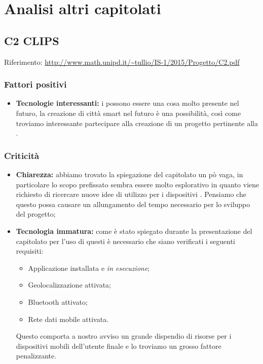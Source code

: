\documentclass{scalatekids-article}
\begin{document}
\section{Analisi altri capitolati}
\subsection{C2 CLIPS}
Riferimento: \url{http://www.math.unipd.it/~tullio/IS-1/2015/Progetto/C2.pdf}\\
\subsubsection{Fattori positivi}
\begin{itemize}
  \item \textbf{Tecnologie interessanti:} i  possono essere una cosa molto presente nel futuro, la creazione di città smart nel futuro è una possibilità, così come troviamo interessante partecipare alla creazione di un progetto pertinente alla .
\end{itemize}
\subsubsection{Criticità}
\begin{itemize}
  \item \textbf{Chiarezza:} abbiamo trovato la spiegazione del capitolato un pò vaga, in particolare lo scopo prefissato sembra essere molto esplorativo in quanto viene richiesto di ricercare nuove idee di utilizzo per i dispositivi . Pensiamo che questo possa causare un allungamento del tempo necessario per lo sviluppo del progetto;
  \item \textbf{Tecnologia immatura:} come è stato spiegato durante la presentazione del capitolato per l'uso di questi  è necessario che siano verificati i seguenti requisiti:
  \begin{itemize}
    \item Applicazione installata e \textit{in esecuzione};
    \item Geolocalizzazione attivata;
    \item Bluetooth attivato;
    \item Rete dati mobile attivata.
  \end{itemize}
  Questo comporta a nostro avviso un grande dispendio di risorse per i dispositivi mobili dell'utente finale e lo troviamo un grosso fattore penalizzante.
\end{itemize}
\end{document}
